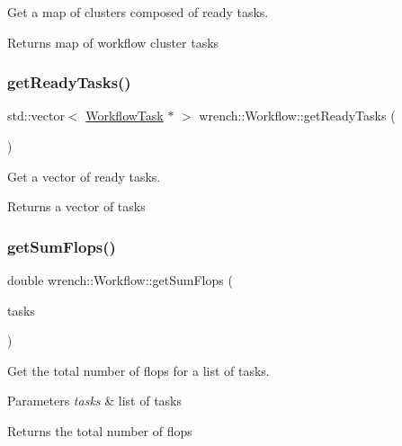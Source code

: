 Get a map of clusters composed of ready tasks. 

\begin{DoxyReturn}{Returns}
map of workflow cluster tasks 
\end{DoxyReturn}
\mbox{\label{classwrench_1_1_workflow_a4834ec73e7a707338bad20d1da8a69ed}} 
\subsubsection{\texorpdfstring{get\+Ready\+Tasks()}{getReadyTasks()}}
{\footnotesize\ttfamily std\+::vector$<$ \hyperlink{classwrench_1_1_workflow_task}{Workflow\+Task} $\ast$ $>$ wrench\+::\+Workflow\+::get\+Ready\+Tasks (\begin{DoxyParamCaption}{ }\end{DoxyParamCaption})}



Get a vector of ready tasks. 

\begin{DoxyReturn}{Returns}
a vector of tasks 
\end{DoxyReturn}
\mbox{\label{classwrench_1_1_workflow_a2d6acb74faf1153f491bf7b52847ce82}} 
\subsubsection{\texorpdfstring{get\+Sum\+Flops()}{getSumFlops()}}
{\footnotesize\ttfamily double wrench\+::\+Workflow\+::get\+Sum\+Flops (\begin{DoxyParamCaption}\item[{std\+::vector$<$ \hyperlink{classwrench_1_1_workflow_task}{Workflow\+Task} $\ast$$>$}]{tasks }\end{DoxyParamCaption})\hspace{0.3cm}{\ttfamily [static]}}



Get the total number of flops for a list of tasks. 


\begin{DoxyParams}{Parameters}
{\em tasks} & list of tasks\\
\hline
\end{DoxyParams}
\begin{DoxyReturn}{Returns}
the total number of flops 
\end{DoxyReturn}
\mbox{\label{classwrench_1_1_workflow_a43d89af79196164d060115ee25200306}} 
